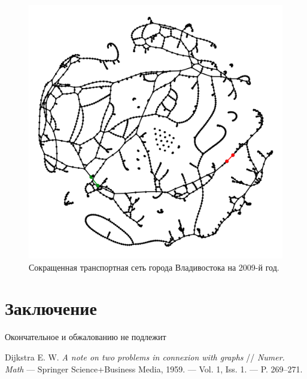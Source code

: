 \documentclass[12pt]{article}
\begin{document}
\begin{figure}[h]
    \centering
    \includegraphics[scale=0.3]{vlad_2009_min_max.png}
    \caption{Сокращенная транспортная сеть города Владивостока на 2009-й год.}
    \label{fig:vlad_2009_min_max}
\end{figure}

\section{Заключение}
Окончательное и обжалованию не подлежит

\newpage

\begin{thebibliography}{9}
Dijkstra E. W. \textit{A note on two problems in connexion with graphs} //
\textit{Numer. Math} — Springer Science+Business Media, 1959.
— Vol. 1, Iss. 1. — P. 269–271.
\end{thebibliography}
\end{document}
